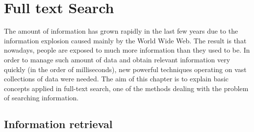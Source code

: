 \chapter{Full text Search}
\label{chap:fulltext}

The amount of information has grown rapidly in the last few years due to the information explosion caused mainly by the World Wide Web. 
The result is that nowadays, people are exposed to much more information than they used to be. 
In order to manage such amount of data and obtain relevant information very quickly (in the order of milliseconds), new powerful techniques operating on vast collections of data were needed.
The aim of this chapter is to explain basic concepts applied in full-text search, one of the methods dealing with the problem of searching information.

%
%


\section{Information retrieval}




